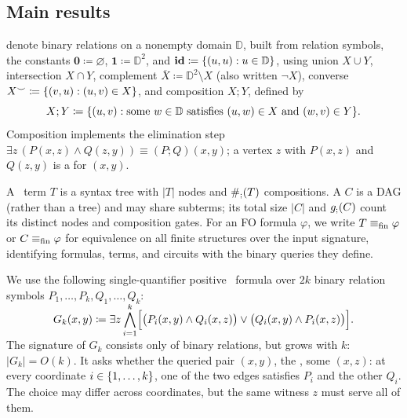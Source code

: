 \subsection{Main results}\label{sec:main-results}

\def\cordom{\mathbb{D}}

 denote binary relations on a nonempty domain $\cordom$,
built from relation symbols,
the constants
$\mathbf{0} \coloneqq \varnothing$, 
$\mathbf{1} \coloneqq \cordom^2$,
and $\id \coloneqq \set{(u,u) : u\in \cordom}$,
using union $X \cup Y$, intersection $X \cap Y$, 
complement $\overline X \coloneqq \cordom^2\setminus X$ (also written $\neg X$),
converse $X^\smile \coloneqq \{ (v,u):(u,v)\in X \}$, and composition $X;Y$, defined by
\[
X;Y \coloneqq \set{(u,v):\text{some }w\in\cordom\text{ satisfies }
 (u,w)\in X \text{ and } (w,v)\in Y}.
\]
Composition implements the elimination step
$\exists z\,(P(x,z)\land Q(z,y))\equiv(P;Q)(x,y)$; a vertex $z$
with $P(x,z)$ and $Q(z,y)$ is a  for $(x,y)$.

A \CoR\ term $T$ is a syntax tree with $|T|$ nodes and $\#_{;}(T)$
compositions.
A  $C$ is a DAG (rather than a tree) and may share subterms;
its total size $|C|$ and $g_{;}(C)$ count its distinct nodes and composition gates.
For an FO formula $\varphi$,
we write $T\equiv_{\mathrm{fin}}\varphi$ or $C\equiv_{\mathrm{fin}}\varphi$ for equivalence on all finite
structures over the input signature, identifying formulas, terms, and circuits with the binary queries they define.

\smallskip
{}
We use the following single-quantifier positive \FOthree\ formula over $2k$ binary relation symbols $P_1,\ldots,P_k,Q_1,\ldots,Q_k$:
\[
 G_k(x,y)\coloneqq\exists z\,\smash{\bigwedge_{i=1}^k}
 \Bigl[\bigl(P_i(x,y)\land Q_i(x,z)\bigr)\lor\bigl(Q_i(x,y)\land P_i(x,z)\bigr)\Bigr].
\]
The signature of $G_k$ consists only of binary relations, but grows with $k$: $|G_k| = O(k)$.
It asks whether the queried pair $(x,y)$, the ,  some  $(x,z)$: at every coordinate $i\in\{ 1,\ldots,k \}$, one of the two edges satisfies $P_i$ and the other $Q_i$.
The choice may differ across coordinates, but the same witness $z$ must serve all of them.

